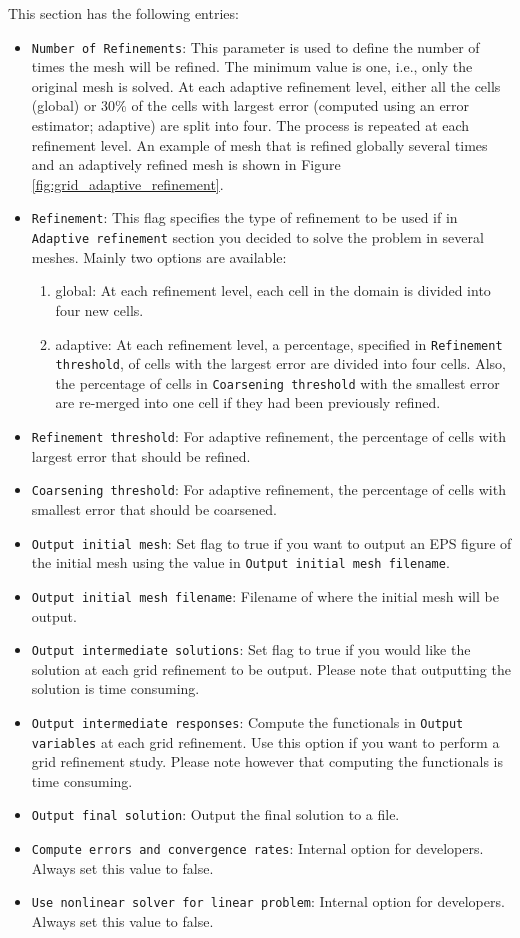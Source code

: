 This section has the following entries:
\begin{itemize}
 \item \texttt{Number of Refinements}: This parameter is used to define the number of times the mesh will be refined. The minimum value is one, i.e., only the original mesh is solved. At each adaptive refinement level, either all the cells (global) or 30\% of the cells with largest error (computed using an error estimator; adaptive) are split into four. The process is repeated at each refinement level. An example of mesh that is refined globally several times and an adaptively refined mesh is shown in Figure \ref{fig:grid_adaptive_refinement}.
   \item  \texttt{Refinement}: This flag specifies the type of refinement to be used if in \texttt{Adaptive refinement} section you decided to solve the problem in several meshes. Mainly two options are available:
  \begin{enumerate}
   \item global: At each refinement level, each cell in the domain is divided into four new cells.
   \item adaptive: At each refinement level, a percentage, specified in \texttt{Refinement threshold}, of cells with the largest error are divided into four cells. Also, the percentage of cells in \texttt{Coarsening threshold} with the smallest error are re-merged into one cell if they had been previously refined. 
  \end{enumerate}
 \item \texttt{Refinement threshold}: For adaptive refinement, the percentage of cells with largest error that should be refined.
 \item \texttt{Coarsening threshold}: For adaptive refinement, the percentage of cells with smallest error that should be coarsened.
 \item \texttt{Output initial mesh}: Set flag to true if you want to output an EPS figure of the initial mesh using the value in \texttt{Output initial mesh filename}.
 \item \texttt{Output initial mesh filename}: Filename of where the initial mesh will be output.
 \item \texttt{Output intermediate solutions}: Set flag to true if you would like the solution at each grid refinement to be output. Please note that outputting the solution is time consuming.
 \item \texttt{Output intermediate responses}: Compute the functionals in \texttt{Output variables} at each grid refinement. Use this option if you want to perform a grid refinement study. Please note however that computing the functionals is time consuming.
 \item \texttt{Output final solution}: Output the final solution to a file.
 \item \texttt{Compute errors and convergence rates}: Internal option for developers. Always set this value to false.
 \item \texttt{Use nonlinear solver for linear problem}: Internal option for developers. Always set this value to false.
\end{itemize}

